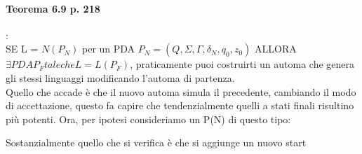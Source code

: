 \documentclass[12pt, a4paper, openany, oneside]{book}
\begin{document}
\paragraph{Teorema 6.9 p. 218}:\\
SE L = $N(P_{N})$ per un PDA $P_{N} = (Q, \Sigma, \Gamma, \delta_{N}, q_{0}, z_{0})$
ALLORA $\exists PDA P_{F} tale che L = L(P_{F})$, praticamente puoi costruirti
un automa che genera gli stessi linguaggi modificando l'automa di partenza. \\
Quello che accade è che il nuovo automa simula il precedente, cambiando il modo
di accettazione, questo fa capire che tendenzialmente quelli a stati finali 
risultino più potenti. Ora, per ipotesi consideriamo un P(N) di questo tipo:
\begin{center}
\end{center}
Sostanzialmente quello che si verifica è che si aggiunge un nuovo start
\end{document}
